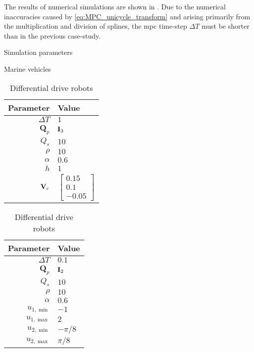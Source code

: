 The results of numerical simulations are shown in .
Due to the numerical inaccuracies caused by \eqref{eq:MPC_unicycle_transform} and arising primarily from the multiplication and division of splines, the \gls{mpc} time-step $\Delta T$ must be shorter than in the previous case-study.

\begin{table}[p]
    \begin{center}
    \captionsetup{width=.9\textwidth}
    \caption{Simulation parameters} \label{tab:handpos_MPC_params}
    \vspace*{-2mm}
    
    \begin{subtable}[t]{0.4\textwidth}
        \caption{Marine vehicles}
        \label{tab:MPC_AUV}
        
        \begin{tabular}[t]{r|l}
            {\bf Parameter} & {\bf Value} \\
            \hline
            $\Delta T$ & $1$ \\
            $\bm{Q}_p$ & $\mathbf{I}_3$ \\
            $Q_s$ & $10$ \\
            $\rho$ & $10$ \\
            $\alpha$ & $0.6$ \\
            $h$ & $1$ \\
            $\mathbf{V}_c$ & $\begin{bmatrix} 0.15 \\ 0.1 \\ -0.05 \end{bmatrix}$
        \end{tabular}
    \end{subtable}
    \begin{subtable}[t]{0.4\textwidth}
        \caption{Differential drive robots}
        \label{tab:MPC_unicycle}
        
        \begin{tabular}[t]{r|l}
            {\bf Parameter} & {\bf Value} \\
            \hline
            $\Delta T$ & $0.1$ \\
            $\bm{Q}_p$ & $\mathbf{I}_2$ \\
            $Q_s$ & $10$ \\
            $\rho$ & $10$ \\
            $\alpha$ & $0.6$ \\
            $u_{1, \min}$ & $-1$ \\
            $u_{1, \max}$ & $2$ \\
            $u_{2, \min}$ & $-\pi / 8$ \\
            $u_{2, \max}$ & $\pi / 8$
        \end{tabular}
    \end{subtable}
    \end{center}
\end{table}
